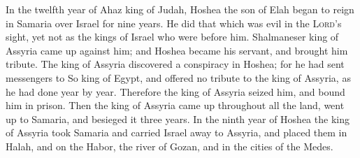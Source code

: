  In the twelfth year of Ahaz king of Judah, Hoshea the son
of Elah began to reign in Samaria over Israel for nine years.
 He did that which was evil in the \textsc{Lord}'s sight,
yet not as the kings of Israel who were before him. 
Shalmaneser king of Assyria came up against him; and Hoshea became his
servant, and brought him tribute.  The king of Assyria
discovered a conspiracy in Hoshea; for he had sent messengers to So king
of Egypt, and offered no tribute to the king of Assyria, as he had done
year by year. Therefore the king of Assyria seized him, and bound him in
prison.  Then the king of Assyria came up throughout all
the land, went up to Samaria, and besieged it three years.
 In the ninth year of Hoshea the king of Assyria took
Samaria and carried Israel away to Assyria, and placed them in Halah,
and on the Habor, the river of Gozan, and in the cities of the Medes.

